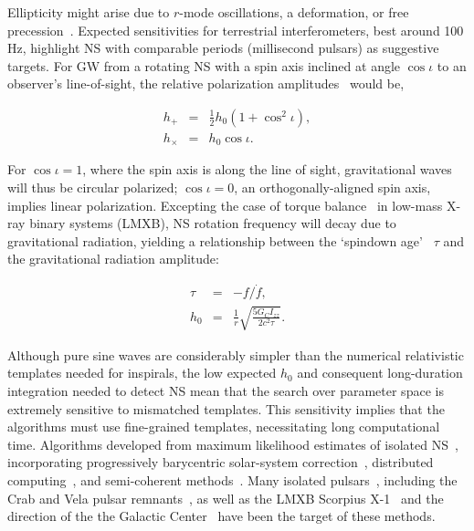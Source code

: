 Ellipticity might arise due to $r$-mode oscillations, a deformation, or free precession~\cite{Shawhan2010}.
Expected sensitivities for terrestrial interferometers, best around 100 Hz, highlight NS with comparable periods (millisecond pulsars) as suggestive targets.
For GW from a rotating NS with a spin axis inclined at angle $\cos \iota$ to an observer's line-of-sight, the relative polarization amplitudes~\cite{DergachevThesis} would be,

\begin{eqnarray} 
h_+ &=& \tfrac{1}{2} h_0 (1 + \cos^2 \iota),\\
h_\times &=& h_0 \cos \iota.
\end{eqnarray}

For $\cos \iota = 1$, where the spin axis is along the line of sight, gravitational waves will thus be circular polarized; $\cos \iota = 0$, an orthogonally-aligned spin axis, implies linear polarization.
Excepting the case of torque balance~\cite{PapaloizouPringle1978,Wagoner1984} in low-mass X-ray binary systems (LMXB), NS rotation frequency will decay due to gravitational radiation, yielding a relationship between the `spindown age'~\cite{Brady1998} $\tau$ and the gravitational radiation amplitude:

        \begin{eqnarray}
        \tau &=& -f / \dot{f}, \\
        h_0 &=& \frac{1}{r} \sqrt{\frac{5 G_C I_{zz}}{2 c^2 \tau}}.
        \end{eqnarray}

Although pure sine waves are considerably simpler than the numerical relativistic templates needed for inspirals, the low expected $h_0$ and consequent long-duration integration needed to detect NS mean that the search over parameter space is extremely sensitive to mismatched templates.
This sensitivity implies that the algorithms must use fine-grained templates, necessitating long computational time.
Algorithms developed from maximum likelihood estimates of isolated NS~\cite{Jaranowski1998}, incorporating progressively barycentric solar-system correction~\cite{LSCPulsarS4}, distributed computing~\cite{LSCEinsteinHome2009}, and semi-coherent methods~\cite{LSCPowerFlux2009}.
Many isolated pulsars~\cite{Abbott2004,LSCPulsar2006}, including the Crab and Vela pulsar remnants~\cite{AasiPulsarInitialResults2014}, as well as the LMXB Scorpius X-1~\cite{AbbottPulsar2006} and the direction of the the Galactic Center~\cite{AasiGalacticCenter2013} have been the target of these methods.

